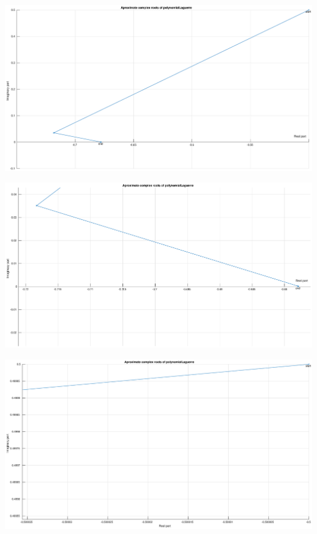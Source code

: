 \documentclass[12pt]{report}
\begin{document}
\begin{center}
   \includegraphics[scale=0.25]{task3complexoverall.eps}
\end{center}

\begin{center}
   \includegraphics[scale=0.25]{task3complexdown.eps}
\end{center}

\begin{center}
   \includegraphics[scale=0.25]{task3complexup.eps}
\end{center}
\end{document}

